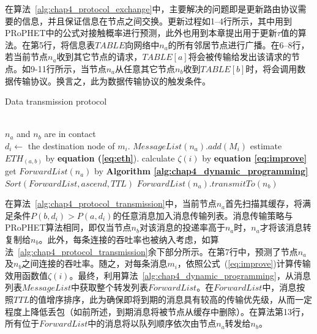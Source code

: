 在算法~\ref{alg:chap4_protocol_exchange}中，主要解决的问题即是更新路由协议需要的信息，并且保证信息在节点之间交换。更新过程如1--4行所示，其中用到PRoPHET中的公式对接触概率进行预测，此外也用到本章提出用于更新$\tau$值的算法。在第5行，将信息表$TABLE$向网络中$n_a$的所有邻居节点进行广播。在6--8行，若当前节点$n_a$收到其它节点的请求，$TABLE[a]$将会被传输给发出该请求的节点。如9-11行所示，当节点$n_a$从任意其它节点$n_b$收到$TABLE[b]$时，将会调用数据传输协议。换言之，此为数据传输协议的触发条件。

\begin{algorithm}[!tbp]
\renewcommand\algorithmicrequire{\textbf{Triggering Condition:}}
\renewcommand\algorithmicensure {\textbf{$\mathbf{n_a}$ Executes:} }
\caption{Data transmission protocol}
\label{alg:chap4_protocol_transmission}
\begin{algorithmic}[1]
\REQUIRE ~~\\ %
$n_a$ and $n_b$ are in contact
\ENSURE ~~\\ %
    \STATE $d_i\leftarrow$ the destination node of $m_i$.
         \STATE $MessageList(n_a).add(M_i)$
    \ENDIF
\ENDFOR
\STATE estimate $ETH_{(a,b)}$ by \textbf{equation (\ref{eq:eth}}).
    \STATE calculate $\zeta(i)$ by \textbf{equation \ref{eq:improve}}
    \STATE get $ForwardList(n_a)$ by \textbf{Algorithm \ref{alg:chap4_dynamic_programming}}
\ENDFOR
\STATE $Sort(ForwardList,ascend,TTL)$
\STATE $ForwardList(n_a).transmitTo(n_b)$
\end{algorithmic}
\end{algorithm}

在算法~\ref{alg:chap4_protocol_transmission}中，当前节点$n_a$首先扫描其缓存，将满足条件$P(b,d_i)>P(a,d_i)$的任意消息加入消息传输列表。消息传输策略与PRoPHET算法相同，即仅当节点$n_b$对该消息的投递率高于$n_a$时，$n_a$才将该消息转复制给$n_b$。此外，每条连接的吞吐率也被纳入考虑，如算法~\ref{alg:chap4_protocol_transmission}余下部分所示。在第7行中，预测了节点$n_a$及$n_b$之间连接的吞吐率。随之，对每条消息$m_i$，依照公式~(\ref{eq:improve})计算传输效用函数值$\zeta(i)$。最终，利用算法~\ref{alg:chap4_dynamic_programming}，从消息列表$MessageList$中获取整个转发列表$ForwardList$。在$ForwardList$中，消息按照$TTL$的值增序排序，此为确保即将到期的消息具有较高的传输优先级，从而一定程度上降低丢包（如前所述，到期消息将被节点从缓存中删除）。在算法第13行，所有位于$ForwardList$中的消息将以队列顺序依次由节点$n_a$转发给$n_b$。


